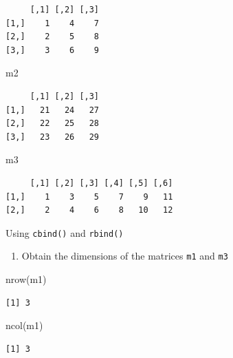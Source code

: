 \documentclass[
  letterpaper,
  DIV=11,
  numbers=noendperiod]{scrreprt}
\newenvironment{Shaded}{\begin{snugshade}}{\end{snugshade}}
\newcommand{\FunctionTok}[1]{\textcolor[rgb]{0.28,0.35,0.67}{#1}}
\newcommand{\NormalTok}[1]{\textcolor[rgb]{0.00,0.23,0.31}{#1}}
\providecommand{\tightlist}{%
  \setlength{\itemsep}{0pt}\setlength{\parskip}{0pt}}\usepackage{longtable,booktabs,array}
\begin{document}
\begin{verbatim}
     [,1] [,2] [,3]
[1,]    1    4    7
[2,]    2    5    8
[3,]    3    6    9
\end{verbatim}

\begin{Shaded}
\begin{Highlighting}[]
\NormalTok{m2}
\end{Highlighting}
\end{Shaded}

\begin{verbatim}
     [,1] [,2] [,3]
[1,]   21   24   27
[2,]   22   25   28
[3,]   23   26   29
\end{verbatim}

\begin{Shaded}
\begin{Highlighting}[]
\NormalTok{m3}
\end{Highlighting}
\end{Shaded}

\begin{verbatim}
     [,1] [,2] [,3] [,4] [,5] [,6]
[1,]    1    3    5    7    9   11
[2,]    2    4    6    8   10   12
\end{verbatim}

Using \texttt{cbind()} and \texttt{rbind()}

\begin{enumerate}
\def\labelenumi{\alph{enumi}.}
\setcounter{enumi}{1}
\tightlist
\item
  Obtain the dimensions of the matrices \texttt{m1} and \texttt{m3}
\end{enumerate}

\begin{Shaded}
\begin{Highlighting}[]
\FunctionTok{nrow}\NormalTok{(m1)}
\end{Highlighting}
\end{Shaded}

\begin{verbatim}
[1] 3
\end{verbatim}

\begin{Shaded}
\begin{Highlighting}[]
\FunctionTok{ncol}\NormalTok{(m1)}
\end{Highlighting}
\end{Shaded}

\begin{verbatim}
[1] 3
\end{verbatim}
\end{document}
